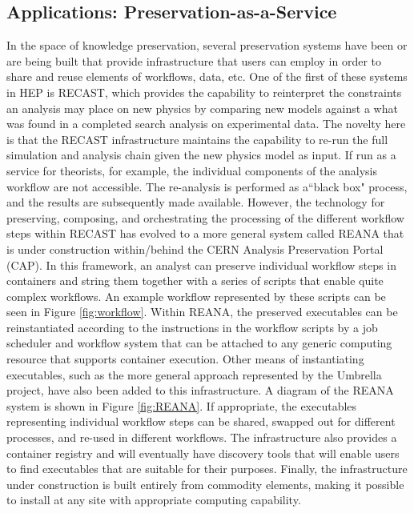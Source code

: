 \documentclass[12pt,a4paper]{article}
\begin{document}
\subsection{Applications: Preservation-as-a-Service}\label{Applications_PaaS}
In the space of knowledge preservation, several preservation systems have been or are being built that provide infrastructure that users can employ in order to share and reuse elements of workflows, data, etc. One of the first of these systems in HEP is RECAST\cite{RECAST}, which provides the capability to reinterpret the constraints an analysis may place on new physics by comparing new models against a what was found in a completed search analysis on experimental data.  The novelty here is that the RECAST infrastructure maintains the capability to re-run the full simulation and analysis chain given the new physics model as input. If run as a service for theorists, for example, the individual components of the analysis workflow are not accessible.  The re-analysis is performed as a``black box" process, and the results are subsequently made available. However, the technology for preserving, composing, and orchestrating the processing of the different workflow steps within RECAST has evolved to a more general system called REANA  that is under construction within/behind the CERN Analysis Preservation Portal (CAP)\cite{CAP}.  In this framework, an analyst can preserve individual workflow steps in containers and string them together with a series of scripts that enable quite complex workflows.  An example workflow represented by these scripts can be seen in Figure \ref{fig:workflow}.  Within REANA, the preserved executables can be reinstantiated according to the instructions in the workflow scripts by a job scheduler and workflow system that can be attached to any generic computing resource that supports container execution. Other means of instantiating executables, such as the more general approach represented by the Umbrella project\cite{Umbrella}, have also been added to this infrastructure.  A diagram of the REANA system is shown in Figure \ref{fig:REANA}. If appropriate, the executables representing individual workflow steps can be shared, swapped out for different processes, and re-used in different workflows.  The infrastructure also provides a container registry and will eventually have discovery tools that will enable users to find executables that are suitable for their purposes.  Finally, the infrastructure under construction is built entirely from commodity elements, making it possible to install at any site with appropriate computing capability.
\end{document}
